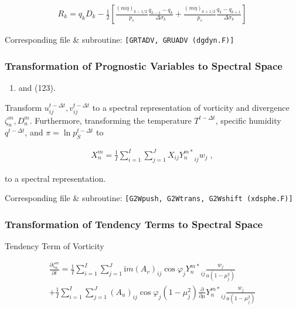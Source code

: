 \begin{eqnarray}
R_k  =  q_k D_k
       - \frac{1}{2}
             \left[   \frac{(m\dot{\eta})_{k-1/2}}{p_s} \frac{q_{k-1} - q_k}{\Delta\sigma_k}
               + \frac{(m\dot{\eta})_{k+1/2}}{p_s} \frac{q_k   - q_{k+1}}{\Delta\sigma_k} \right]
\end{eqnarray}

Corresponding file \& subroutine: \texttt{{[}GRTADV,\ GRUADV\ (dgdyn.F){]}}

\hypertarget{transformation-of-prognostic-variables-to-spectral-space}{%
\subsubsection{Transformation of Prognostic Variables to Spectral Space}\label{transformation-of-prognostic-variables-to-spectral-space}}

\begin{enumerate}
\def\labelenumi{(\arabic{enumi})}
\setcounter{enumi}{121}
\tightlist
\item
  and (123).
\end{enumerate}

Transform \(u_{ij}^{t-\Delta t}, v_{ij}^{t-\Delta t}\) to a spectral representation of vorticity and divergence \(\zeta_n^m, D_n^m\). Furthermore, transforming the temperature \(T^{t-\Delta t}\),
specific humidity \(q^{t-\Delta t}\), and \(\pi = \ln p_S^{t-\Delta t}\) to

\begin{eqnarray}
  X_n^m  =  \frac{1}{I} \sum_{i=1}^{I} \sum_{j=1}^{J}  
               X_{ij} {Y_n^{m *}}_{ij}  w_j \; ,
\end{eqnarray}

to a spectral representation.

Corresponding file \& subroutine: \texttt{{[}G2Wpush,\ G2Wtrans,\ G2Wshift\ (xdsphe.F){]}}

\hypertarget{transformation-of-tendency-terms-to-spectral-space}{%
\subsubsection{Transformation of Tendency Terms to Spectral Space}\label{transformation-of-tendency-terms-to-spectral-space}}

Tendency Term of Vorticity

\begin{eqnarray}
  \frac{\partial{\zeta_n^m}}{\partial {t}}
    =  \frac{1}{I} \sum_{i=1}^{I} \sum_{j=1}^{J}  
    \mathrm{i}m (A_v)_{ij} \cos \varphi_j
    {Y_n^{m *}}_{ij}
    \frac{w_j}{a(1-\mu_j^{2})}
\\
  +\frac{1}{I} \sum_{i=1}^{I} \sum_{j=1}^{J}  
    (A_u)_{ij} \cos \varphi_j
    (1-\mu_j^2)
    \frac{\partial }{\partial \mu} {Y_n^{m *}}_{ij}
    \frac{w_j}{a(1-\mu_j^{2})}
\end{eqnarray}

